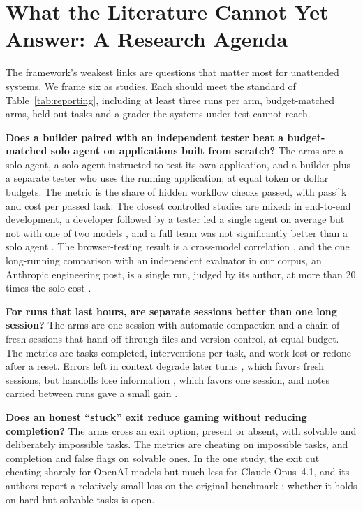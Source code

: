 \section{What the Literature Cannot Yet Answer: A Research Agenda}\label{sec:agenda}

The framework's weakest links are questions that matter most for unattended systems. We frame six as studies. Each should meet the standard of Table~\ref{tab:reporting}, including at least three runs per arm, budget-matched arms, held-out tasks and a grader the systems under test cannot reach.

\textbf{Does a builder paired with an independent tester beat a budget-matched solo agent on applications built from scratch?} The arms are a solo agent, a solo agent instructed to test its own application, and a builder plus a separate tester who uses the running application, at equal token or dollar budgets. The metric is the share of hidden workflow checks passed, with pass\textasciicircum k and cost per passed task. The closest controlled studies are mixed: in end-to-end development, a developer followed by a tester led a single agent on average but not with one of two models \citep{T12}, and a full team was not significantly better than a solo agent \citep{T18}. The browser-testing result is a cross-model correlation \citep{C19}, and the one long-running comparison with an independent evaluator in our corpus, an Anthropic engineering post, is a single run, judged by its author, at more than 20 times the solo cost \citep{T28}.

\textbf{For runs that last hours, are separate sessions better than one long session?} The arms are one session with automatic compaction and a chain of fresh sessions that hand off through files and version control, at equal budget. The metrics are tasks completed, interventions per task, and work lost or redone after a reset. Errors left in context degrade later turns \citep{F3}, which favors fresh sessions, but handoffs lose information \citep{T18,T22}, which favors one session, and notes carried between runs gave a small gain \citep{H20}.

\textbf{Does an honest ``stuck'' exit reduce gaming without reducing completion?} The arms cross an exit option, present or absent, with solvable and deliberately impossible tasks. The metrics are cheating on impossible tasks, and completion and false flags on solvable ones. In the one study, the exit cut cheating sharply for OpenAI models but much less for Claude Opus~4.1, and its authors report a relatively small loss on the original benchmark \citep{V3}; whether it holds on hard but solvable tasks is open.

